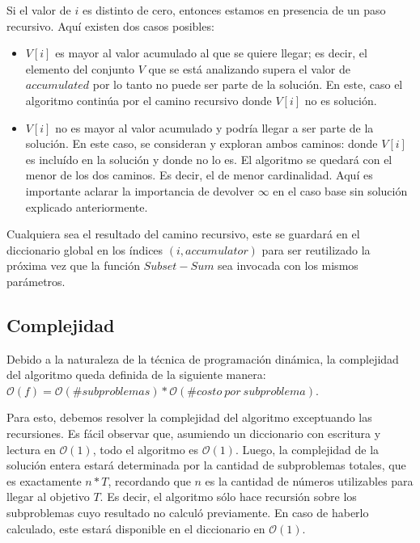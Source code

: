 Si el valor de $i$ es distinto de cero, entonces estamos en presencia de un paso recursivo. Aquí existen dos casos posibles:
\begin{itemize}
	\item $V[i]$ es mayor al valor acumulado al que se quiere llegar; es decir, el elemento del conjunto $V$ que se está analizando supera el valor de $accumulated$ por lo tanto no puede ser parte de la solución. En este, caso el algoritmo continúa por el camino recursivo donde $V[i]$ no es solución.
	\item $V[i]$ no es mayor al valor acumulado y podría llegar a ser parte de la solución. En este caso, se consideran y exploran ambos caminos: donde $V[i]$ es incluído en la solución y donde no lo es. El algoritmo se quedará con el menor de los dos caminos. Es decir, el de menor cardinalidad. Aquí es importante aclarar la importancia de devolver $\infty$ en el caso base sin solución explicado anteriormente.
\end{itemize}
Cualquiera sea el resultado del camino recursivo, este se guardará en el diccionario global en los índices $(i, accumulator)$ para ser reutilizado la próxima vez que la función $Subset-Sum$ sea invocada con los mismos parámetros.

\subsection{Complejidad}
Debido a la naturaleza de la técnica de programación dinámica, la complejidad del algoritmo queda definida de la siguiente manera:
$\mathcal{O}(f) = \mathcal{O}(\#subproblemas) * \mathcal{O}(\#costo \ por \ subproblema)$.

\vskip 8pt

Para esto, debemos resolver la complejidad del algoritmo exceptuando las recursiones. Es fácil observar que, asumiendo un diccionario con escritura y lectura en $\mathcal{O}(1)$, todo el algoritmo es $\mathcal{O}(1)$. Luego, la complejidad de la solución entera estará determinada por la cantidad de subproblemas totales, que es exactamente $n * T$, recordando que $n$ es la cantidad de números utilizables para llegar al objetivo $T$. Es decir, el algoritmo sólo hace recursión sobre los subproblemas cuyo resultado no calculó previamente. En caso de haberlo calculado, este estará disponible en el diccionario en $\mathcal{O}(1)$.